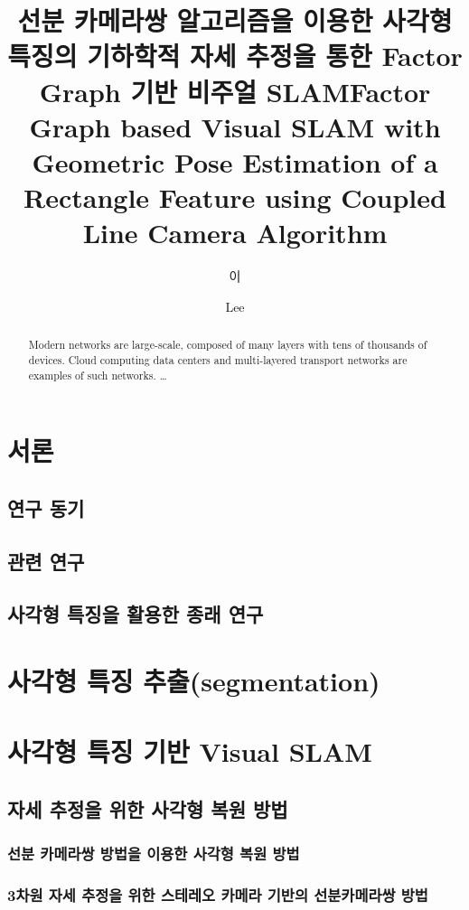 \documentclass[master,korean,final]{cbnu-ecs}
\title[korean]{선분 카메라쌍 알고리즘을 이용한 사각형 특징의 기하학적 자세 추정을 통한 Factor Graph 기반 비주얼 SLAM}
\title[english]{Factor Graph based Visual SLAM with Geometric Pose Estimation of a Rectangle Feature using Coupled Line Camera Algorithm}
\author[korean] {이}{재 민}
\author[english]{Lee}{Jae min}
\begin{document}
\tableofcontents

\begin{abstract}
Modern networks are large-scale, composed of many layers with tens of thousands of devices. 
Cloud computing data centers and multi-layered transport networks are 
examples of such networks.
\ldots
\end{abstract}

\listoftables

\listoffigures



\chapter{서론}


\section{연구 동기}
\section{관련 연구}
\section{사각형 특징을 활용한 종래 연구}
\chapter{사각형 특징 추출(segmentation)}
\chapter{사각형 특징 기반 Visual SLAM}
\section{자세 추정을 위한 사각형 복원 방법}
\subsection{선분 카메라쌍 방법을 이용한 사각형 복원 방법}
\subsection{3차원 자세 추정을 위한 스테레오 카메라 기반의 선분카메라쌍 방법}
\end{document}
